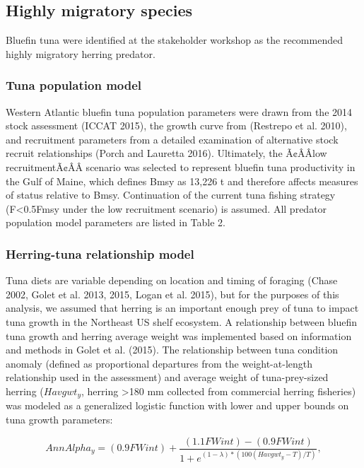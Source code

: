 \documentclass[]{article}
\begin{document}
\subsection{Highly migratory species}\label{highly-migratory-species}

Bluefin tuna were identified at the stakeholder workshop as the
recommended highly migratory herring predator.

\subsubsection{Tuna population model}\label{tuna-population-model}

Western Atlantic bluefin tuna population parameters were drawn from the
2014 stock assessment (ICCAT 2015), the growth curve from (Restrepo et
al. 2010), and recruitment parameters from a detailed examination of
alternative stock recruit relationships (Porch and Lauretta 2016).
Ultimately, the Ã¢ÂÂlow recruitmentÃ¢ÂÂ scenario was selected to
represent bluefin tuna productivity in the Gulf of Maine, which defines
Bmsy as 13,226 t and therefore affects measures of status relative to
Bmsy. Continuation of the current tuna fishing strategy
(F\textless{}0.5Fmsy under the low recruitment scenario) is assumed. All
predator population model parameters are listed in Table 2.

\subsubsection{Herring-tuna relationship
model}\label{herring-tuna-relationship-model}

Tuna diets are variable depending on location and timing of foraging
(Chase 2002, Golet et al. 2013, 2015, Logan et al. 2015), but for the
purposes of this analysis, we assumed that herring is an important
enough prey of tuna to impact tuna growth in the Northeast US shelf
ecosystem. A relationship between bluefin tuna growth and herring
average weight was implemented based on information and methods in Golet
et al. (2015). The relationship between tuna condition anomaly (defined
as proportional departures from the weight-at-length relationship used
in the assessment) and average weight of tuna-prey-sized herring
(\(Havgwt_{y}\), herring \textgreater{}180 mm collected from commercial
herring fisheries) was modeled as a generalized logistic function with
lower and upper bounds on tuna growth parameters:

\begin{equation}
AnnAlpha_{y} = (0.9 FWint) + \frac{(1.1 FWint) - (0.9 FWint)}{1+e^{(1-\lambda)*(100(Havgwt_{y}-T)/T)}} \label{tunagrow_equation},
\end{equation}
\end{document}
